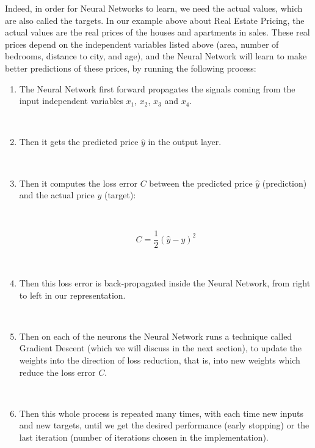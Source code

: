 \documentclass[]{book}
\begin{document}
Indeed, in order for Neural Networks to learn, we need the actual values, which are also called the targets. In our example above about Real Estate Pricing, the actual values are the real prices of the houses and apartments in sales. These real prices depend on the independent variables listed above (area, number of bedrooms, distance to city, and age), and the Neural Network will learn to make better predictions of these prices, by running the following process:

\begin{enumerate}
    \item The Neural Network first forward propagates the signals coming from the input independent variables $x_1$, $x_2$, $x_3$ and $x_4$.
    
    \
    
    \item Then it gets the predicted price $\hat{y}$ in the output layer.
    
    \
    
    \item Then it computes the loss error $C$ between the predicted price $\hat{y}$ (prediction) and the actual price $y$ (target):
    
    \
    
    \begin{equation*}
        C = \frac{1}{2} (\hat{y} - y)^2
    \end{equation*}
    
    \
    
    \item Then this loss error is back-propagated inside the Neural Network, from right to left in our representation.
    
    \
    
    \item Then on each of the neurons the Neural Network runs a technique called Gradient Descent (which we will discuss in the next section), to update the weights into the direction of loss reduction, that is, into new weights which reduce the loss error $C$.
    
    \
    
    \item Then this whole process is repeated many times, with each time new inputs and new targets, until we get the desired performance (early stopping) or the last iteration (number of iterations chosen in the implementation).
\end{enumerate}
\end{document}
